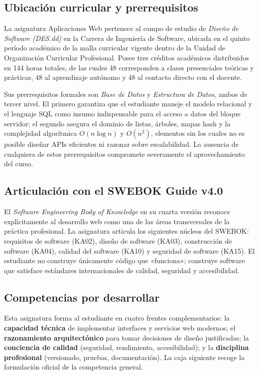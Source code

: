 \documentclass[11pt,a4paper,openany]{book}
\begin{document}
\subsection{Ubicación curricular y prerrequisitos}

La asignatura Aplicaciones Web pertenece al campo de estudio de
\emph{Diseño de Software (DES.dd)} en la Carrera de Ingeniería de
Software, ubicada en el quinto período académico de la malla curricular
vigente dentro de la Unidad de Organización Curricular Profesional.
Posee tres créditos académicos distribuidos en 144 horas totales, de
las cuales 48 corresponden a clases presenciales teóricas y prácticas,
48 al aprendizaje autónomo y 48 al contacto directo con el docente.

Sus prerrequisitos formales son \emph{Base de Datos} y \emph{Estructura
de Datos}, ambos de tercer nivel. El primero garantiza que el
estudiante maneje el modelo relacional y el lenguaje SQL como insumo
indispensable para el acceso a datos del bloque servidor; el segundo
asegura el dominio de listas, árboles, mapas hash y la complejidad
algorítmica $O(n\log n)$ y $O(n^2)$, elementos sin los cuales no es
posible diseñar APIs eficientes ni razonar sobre escalabilidad. La
ausencia de cualquiera de estos prerrequisitos compromete severamente
el aprovechamiento del curso.

\subsection{Articulación con el SWEBOK Guide v4.0}

El \emph{Software Engineering Body of Knowledge} en su cuarta versión
\cite{washizaki2024swebok} reconoce explícitamente al desarrollo web
como una de las áreas transversales de la práctica profesional. La
asignatura articula los siguientes núcleos del SWEBOK: requisitos de
software (KA02), diseño de software (KA03), construcción de software
(KA04), calidad del software (KA10) y seguridad de software (KA15). El
estudiante no construye únicamente código que «funciona»; construye
software que satisface estándares internacionales de calidad,
seguridad y accesibilidad.

\subsection{Competencias por desarrollar}

Esta asignatura forma al estudiante en cuatro frentes complementarios:
la \textbf{capacidad técnica} de implementar interfaces y servicios
web modernos; el \textbf{razonamiento arquitectónico} para tomar
decisiones de diseño justificadas; la \textbf{conciencia de calidad}
(seguridad, rendimiento, accesibilidad); y la \textbf{disciplina
profesional} (versionado, pruebas, documentación). La caja siguiente
recoge la formulación oficial de la competencia general.
\end{document}
